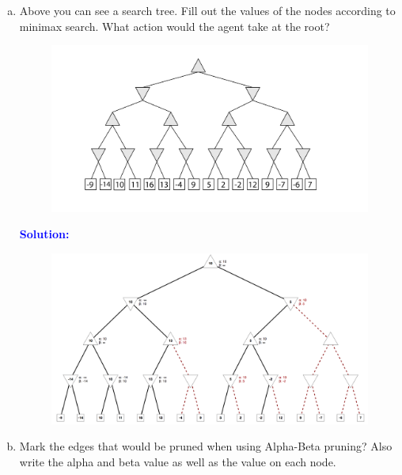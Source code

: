\documentclass[a4paper]{article}
\begin{document}
\begin{enumerate}[(a)]
\item Above you can see a search tree. Fill out the values of the nodes according to minimax search. What action would the agent take at the root?

\begin{center}
\begin{figure}[h!]
\centering
\includegraphics[width=1.25\textwidth]{figs/minmax}
\end{figure}
\end{center}

\textcolor{blue}{\textbf{Solution:}}

\begin{center}
\begin{figure}[h!]
\centering
\includegraphics[width=1\textwidth]{figs/alphabeta-sol}
\end{figure}
\end{center}

\item Mark the edges that would be pruned when using Alpha-Beta pruning? Also write the alpha and beta value as well as the value on each node. 



\end{enumerate}
\end{document}
